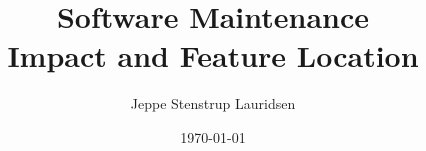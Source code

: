 \documentclass[12pt]{article}
\title{%
Software Maintenance \\
\large Impact and Feature Location}
\author{Jeppe Stenstrup Lauridsen}
\date{\today}
\begin{document}
\begin{titlepage}
\clearpage\maketitle
\thispagestyle{empty}
\end{titlepage}



\end{document}
